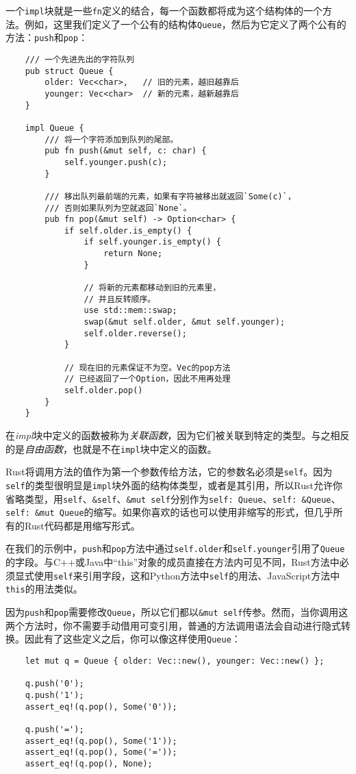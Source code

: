 一个\texttt{impl}块就是一些\texttt{fn}定义的结合，每一个函数都将成为这个结构体的一个方法。例如，这里我们定义了一个公有的结构体\texttt{Queue}，然后为它定义了两个公有的方法：\texttt{push}和\texttt{pop}：
\begin{verbatim}
    /// 一个先进先出的字符队列
    pub struct Queue {
        older: Vec<char>,   // 旧的元素，越旧越靠后
        younger: Vec<char>  // 新的元素，越新越靠后
    }

    impl Queue {
        /// 将一个字符添加到队列的尾部。
        pub fn push(&mut self, c: char) {
            self.younger.push(c);
        }

        /// 移出队列最前端的元素，如果有字符被移出就返回`Some(c)`，
        /// 否则如果队列为空就返回`None`。
        pub fn pop(&mut self) -> Option<char> {
            if self.older.is_empty() {
                if self.younger.is_empty() {
                    return None;
                }

                // 将新的元素都移动到旧的元素里，
                // 并且反转顺序。
                use std::mem::swap;
                swap(&mut self.older, &mut self.younger);
                self.older.reverse();
            }

            // 现在旧的元素保证不为空。Vec的pop方法
            // 已经返回了一个Option，因此不用再处理
            self.older.pop()
        }
    }
\end{verbatim}

在\emph{impl}块中定义的函数被称为\emph{关联函数}，因为它们被关联到特定的类型。与之相反的是\emph{自由函数}，也就是不在\texttt{impl}块中定义的函数。

Rust将调用方法的值作为第一个参数传给方法，它的参数名必须是\texttt{self}。因为\texttt{self}的类型很明显是\texttt{impl}块外面的结构体类型，或者是其引用，所以Rust允许你省略类型，用\texttt{self}、\texttt{\&self}、\texttt{\&mut self}分别作为\texttt{self: Queue}、\texttt{self: \&Queue}、\texttt{self: \&mut Queue}的缩写。如果你喜欢的话也可以使用非缩写的形式，但几乎所有的Rust代码都是用缩写形式。

在我们的示例中，\texttt{push}和\texttt{pop}方法中通过\texttt{self.older}和\texttt{self.younger}引用了\texttt{Queue}的字段。与C++或Java中“this”对象的成员直接在方法内可见不同，Rust方法中必须显式使用\texttt{self}来引用字段，这和Python方法中\texttt{self}的用法、JavaScript方法中\texttt{this}的用法类似。

因为\texttt{push}和\texttt{pop}需要修改\texttt{Queue}，所以它们都以\texttt{\&mut self}传参。然而，当你调用这两个方法时，你不需要手动借用可变引用，普通的方法调用语法会自动进行隐式转换。因此有了这些定义之后，你可以像这样使用\texttt{Queue}：
\begin{verbatim}
    let mut q = Queue { older: Vec::new(), younger: Vec::new() };

    q.push('0');
    q.push('1');
    assert_eq!(q.pop(), Some('0'));

    q.push('=');
    assert_eq!(q.pop(), Some('1'));
    assert_eq!(q.pop(), Some('='));
    assert_eq!(q.pop(), None);
\end{verbatim}

